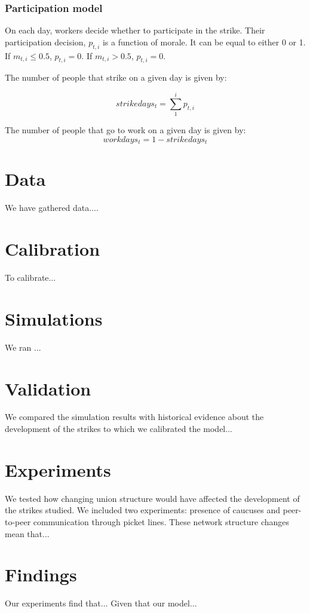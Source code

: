 \documentclass[a4paper]{article}
\begin{document}
\subsubsection{Participation model}

On each day, workers decide whether to participate in the strike. Their participation decision, $p_{t,i}$ is a function of morale. It can be equal to either 0 or 1. If $m_{t,i}\leq0.5$, $p_{t,i}=0$. If $m_{t,i}>0.5$, $p_{t,i}=0$. 

The number of people that strike on a given day is given by:

\begin{equation}
    strikedays_t = \sum_{1}^{i} p_{t,i}
\end{equation}

The number of people that go to work on a given day is given by:
\begin{equation}
workdays_t = 1 - strikedays_t
\end{equation}


\section{Data}
We have gathered data....

\section{Calibration}
To calibrate...

\section{Simulations}
We ran ...

\section{Validation}
We compared the simulation results with historical evidence about the development of the strikes to which we calibrated the model...

\section{Experiments}
We tested how changing union structure would have affected the development of the strikes studied. We included two experiments: presence of caucuses and peer-to-peer communication through picket lines. These network structure changes mean that...

\section{Findings}
Our experiments find that... Given that our model...
\end{document}

